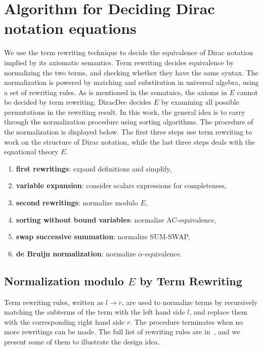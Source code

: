 \documentclass[runningheads]{llncs}
\begin{document}


\section{Algorithm for Deciding Dirac notation equations}
\label{sec: decide}

We use the term rewriting technique to decide the equivalence of Dirac notation implied by its axiomatic semantics.
Term rewriting decides equivalence by normalizing the two terms, and checking whether they have the same syntax.
The normalization is powered by matching and substitution in universal algebra, using a set of rewriting rules.
As is mentioned in the sematnics, the axioms in $E$ cannot be decided by term rewriting.
DiracDec decides $E$ by examining all possible permutations in the rewriting result.
In this work, the general idea is to carry through the normalization procedure using sorting algorithms. 
The procedure of the normalization is displayed below. 
The first three steps use term rewriting to work on the structure of Dirac notation, while the last three steps deals with the equational theory $E$.
\begin{enumerate}
    \item \textbf{first rewritings}: expand definitions and simplify,
    \item \textbf{variable expansion}: consider scalars expressions for completeness,
    \item \textbf{second rewritings}: normalize modulo $E$,
    \item \textbf{sorting without bound variables}: normalize AC-equivalence,
    \item \textbf{swap successive summation}: normalize SUM-SWAP,
    \item \textbf{de Bruijn normalization}: normalize $\alpha$-equivalence.
\end{enumerate}

% 


\subsection{Normalization modulo $E$ by Term Rewriting}
Term rewriting rules, written as $l \to r$, are used to normalize terms by recursively matching the subterms of the term with the left hand side $l$, and replace them with the corresponding right hand side $r$. The procedure terminates when no more rewritings can be made.
The full list of rewriting rules are in~, and we present some of them to illustrate the design idea.
\end{document}
